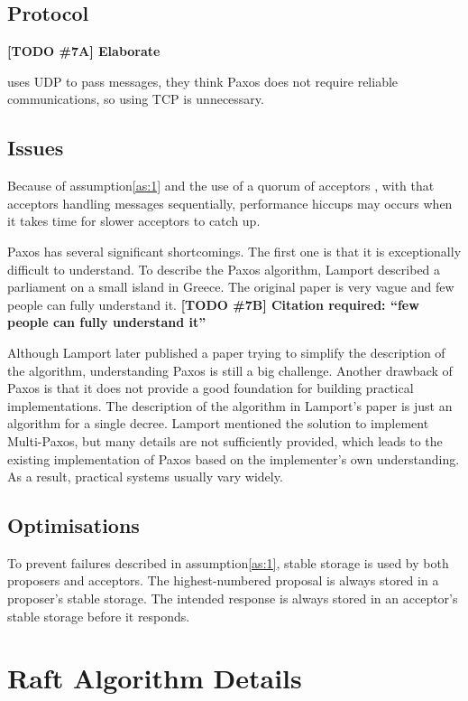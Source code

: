 \documentclass[12pt, a4paper]{article}
\newcommand{\todo}[2]{\textbf{\color{blue}[TODO \##1] #2}\par}
\begin{document}
\subsection{Protocol}
\todo{7A}{Elaborate}
\cite{PaxosMadeSwitch-y} uses UDP to pass messages, they think Paxos does not require reliable communications, so using TCP is unnecessary.

\subsection{Issues}
Because of assumption\ref{as:1} and the use of a quorum of acceptors \cite{jalili2014practical}, with that acceptors handling messages sequentially, performance hiccups may occurs when it takes time for slower acceptors to catch up.

Paxos has several significant shortcomings. The first one is that it is exceptionally difficult to understand\cite{conf/usenix/OngaroO14}. To describe the Paxos algorithm, Lamport described a parliament on a small island in Greece\cite{lamport1998part}. The original paper is very vague and few people can fully understand it.
\todo{7B}{Citation required: ``few people can fully understand it''}
Although Lamport later published a paper trying to simplify the description of the algorithm\cite{lamport2001paxos}, understanding Paxos is still a big challenge. Another drawback of Paxos is that it does not provide a good foundation for building practical implementations\cite{conf/usenix/OngaroO14}. The description of the algorithm in Lamport's paper is just an algorithm for a single decree. Lamport mentioned the solution to implement Multi-Paxos, but many details are not sufficiently provided, which leads to the existing implementation of Paxos based on the implementer's own understanding. As a result, practical systems usually vary widely.

\subsection{Optimisations}
To prevent failures described in assumption\ref{as:1}, stable storage is used by both proposers and acceptors. The highest-numbered proposal is always stored in a proposer's stable storage. The intended response is always stored in an acceptor's stable storage before it responds.


\section{Raft Algorithm Details} \label{sec:raft}
\end{document}
